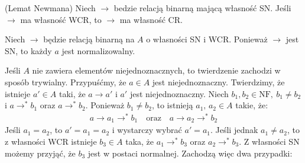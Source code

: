\begin{twierdzenie}(Lemat Newmana)\label{thm:newman_lemma}
Niech \(\to\) bedzie relacją binarną mającą własność SN. Jeśli \(\to\) ma własność WCR, to \(\to\) ma własność CR.
\end{twierdzenie}
\begin{dowod}

Niech \(\to\) będzie relacją binarną na \(A\) o własności SN i WCR. Ponieważ \(\to\) jest SN, to każdy \(a\) jest normalizowalny.

  Jeśli \(A\) nie zawiera elementów niejednoznacznych, to twierdzenie zachodzi w sposób trywialny. Przypuśćmy, że \(a\in A\) jest niejednoznaczny. Twierdzimy, że istnieje \(a'\in A\) taki, że \(a\to a'\) i \(a'\) jest niejednoznaczny. Niech \(b_1, b_2\in \mathrm{NF},\ b_1\neq b_2\) i \(a\to^{*} b_1\) oraz \(a\to^{*} b_2\). Ponieważ \(b_1\neq b_2\), to istnieją \(a_1,\,a_2\in A\) takie, że: 
      \begin{align*}
        a \to a_1 \to^{*} b_1 \quad \text{oraz} \quad a\to a_2 \to^{*} b_2
      \end{align*}
Jeśli \(a_1=a_2\), to \(a'=a_1=a_2\) i wystarczy wybrać \(a'=a_1\).  Jeśli jednak \(a_1 \neq a_2\), to z własności WCR istnieje \(b_3 \in A\) taka, że \(a_1 \to^{*} b_3\) oraz \(a_2 \to^{*} b_3\).  Z własności SN możemy przyjąć, że \(b_3\) jest w postaci normalnej.  
Zachodzą więc dwa przypadki:


\end{dowod}
